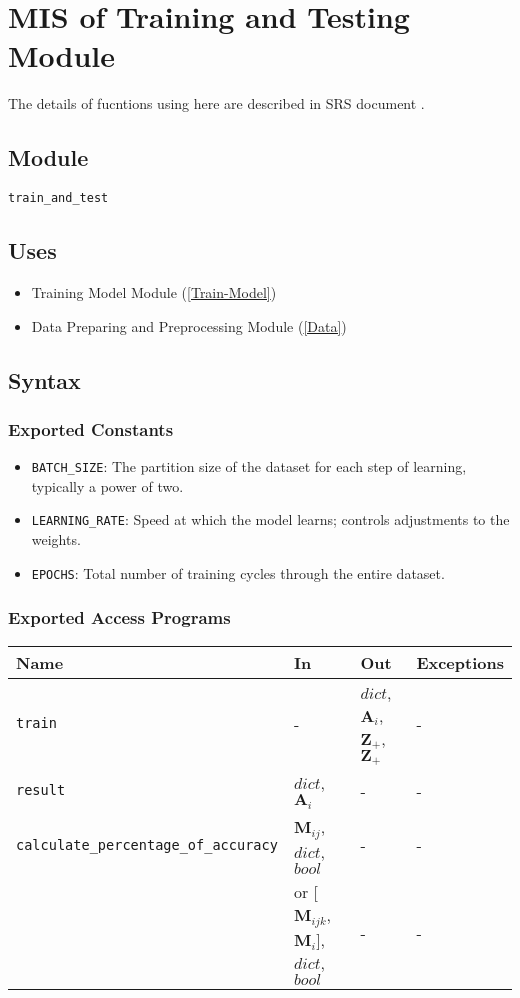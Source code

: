 \documentclass[12pt, titlepage]{article}
\def\code#1{\texttt{#1}}
\begin{document}
\newpage

\section{MIS of Training and Testing Module} \label{Train} 
The details of fucntions using here are described in SRS document \cite{SRS}.
\subsection{Module}
\code{train\_and\_test} 

\subsection{Uses}
\begin{itemize}
  \item Training Model Module (\ref{Train-Model})
  \item Data Preparing and Preprocessing Module (\ref{Data})
\end{itemize}


\subsection{Syntax}
\subsubsection{Exported Constants} \label{Train-Const}
\begin{itemize}
  \item \code{BATCH\_SIZE}: The partition size of the dataset for each step of learning, 
  typically a power of two.
  \item \code{LEARNING\_RATE}: Speed at which the model learns; controls adjustments to the weights.
  \item \code{EPOCHS}: Total number of training cycles through the entire dataset.
\end{itemize}

\subsubsection{Exported Access Programs}

\begin{center}
\begin{tabular}{p{7cm} p{3cm} p{3cm} p{2cm}}
\hline
\textbf{Name} & \textbf{In} & \textbf{Out} & \textbf{Exceptions} \\
\hline
\code{train} &- & $dict$, $\mathbf{A}_{i}$, $\mathbf{Z}_{+}$, $\mathbf{Z}_{+}$  & -\\
\code{result} & $dict$, $\mathbf{A}_{i}$ & - & -\\
\code{calculate\_percentage\_of\_accuracy} & $\mathbf{M}_{ij}$, $dict$, $bool$ & - & -\\
                                           & or [$\mathbf{M}_{ijk}$, $\mathbf{M}_{i}$], $dict$, $bool$ & - & -\\
\hline
\end{tabular}
\end{center}
\end{document}
